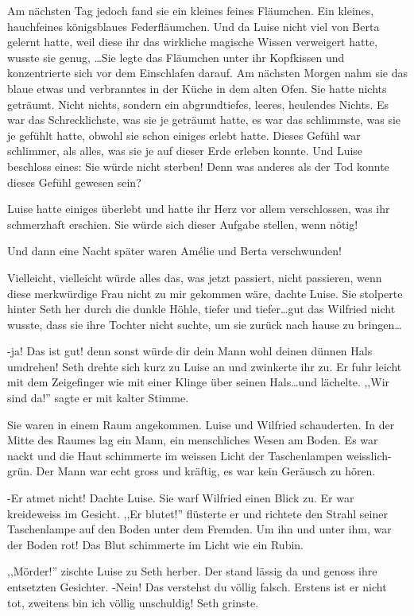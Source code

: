 Am nächsten Tag jedoch fand sie ein kleines feines Fläumchen. Ein kleines, hauchfeines königsblaues Federfläumchen. Und da Luise nicht viel von Berta gelernt hatte, weil diese ihr das wirkliche magische Wissen verweigert hatte, wusste sie genug, \dots Sie legte das Fläumchen unter ihr Kopfkissen und konzentrierte sich vor dem Einschlafen darauf. Am nächsten Morgen nahm sie das blaue etwas und verbranntes in der Küche in dem alten Ofen. Sie hatte nichts geträumt. Nicht nichts, sondern ein abgrundtiefes, leeres, heulendes Nichts. Es war das Schrecklichste, was sie je geträumt hatte, es war das schlimmste, was sie je gefühlt hatte, obwohl sie schon einiges erlebt hatte. Dieses Gefühl war schlimmer, als alles, was sie je auf dieser Erde erleben konnte. Und Luise beschloss eines: Sie würde nicht sterben! Denn was anderes als der Tod konnte dieses Gefühl gewesen sein? 

Luise hatte einiges überlebt und hatte ihr Herz vor allem verschlossen, was ihr schmerzhaft erschien. Sie würde sich dieser Aufgabe stellen, wenn nötig! 

Und dann eine Nacht später waren Amélie und Berta verschwunden!

Vielleicht, vielleicht würde alles das, was jetzt passiert, nicht passieren, wenn diese merkwürdige Frau nicht zu mir gekommen wäre, dachte Luise. Sie stolperte hinter Seth her durch die dunkle Höhle, tiefer und tiefer\dots gut das Wilfried nicht wusste, dass sie ihre Tochter nicht suchte, um sie zurück nach hause zu bringen\dots

-ja! Das ist gut! denn sonst würde dir dein Mann wohl deinen dünnen Hals umdrehen! Seth drehte sich kurz zu Luise an und zwinkerte ihr zu. Er fuhr leicht mit dem Zeigefinger wie mit einer Klinge über seinen Hals\dots und lächelte. ,,Wir sind da!'' sagte er mit kalter Stimme.

Sie waren in einem Raum angekommen. Luise und Wilfried schauderten. In der Mitte des Raumes lag ein Mann, ein menschliches Wesen am Boden. Es war nackt und die Haut schimmerte im weissen Licht der Taschenlampen weisslich-grün. Der Mann war echt gross und kräftig, es war kein Geräusch zu hören.

-Er atmet nicht! Dachte Luise. Sie warf Wilfried einen Blick zu. Er war kreideweiss im Gesicht. ,,Er blutet!'' flüsterte er und richtete den Strahl seiner Taschenlampe auf den Boden unter dem Fremden. Um ihn und unter ihm, war der Boden rot! Das Blut schimmerte im Licht wie ein Rubin.

,,Mörder!'' zischte Luise zu Seth herber. Der stand lässig da und genoss ihre entsetzten Gesichter. -Nein! Das verstehst du völlig falsch. Erstens ist er nicht tot, zweitens bin ich völlig unschuldig! Seth grinste.

